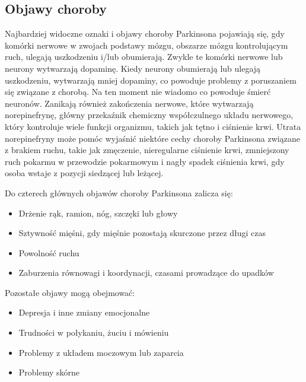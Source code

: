 
\subsection{Objawy choroby}
\label{subsec:objawy}

Najbardziej widoczne oznaki i objawy choroby Parkinsona pojawiają się, gdy komórki nerwowe w zwojach podstawy mózgu,
obszarze mózgu kontrolującym ruch, ulegają uszkodzeniu i/lub obumierają.
Zwykle te komórki nerwowe lub neurony wytwarzają dopaminę.
Kiedy neurony obumierają lub ulegają uszkodzeniu, wytwarzają mniej dopaminy, co powoduje problemy z poruszaniem się
związane z chorobą.
Na ten moment nie wiadomo co powoduje śmierć neuronów.
Zanikają również zakończenia nerwowe, które wytwarzają norepinefrynę, główny przekaźnik chemiczny
współczulnego układu nerwowego, który kontroluje wiele funkcji organizmu, takich jak tętno i ciśnienie krwi.
Utrata norepinefryny może pomóc wyjaśnić niektóre cechy choroby Parkinsona związane z brakiem ruchu, takie jak zmęczenie,
nieregularne ciśnienie krwi, zmniejszony ruch pokarmu w przewodzie pokarmowym i nagły spadek ciśnienia krwi, gdy osoba wstaje z pozycji siedzącej lub leżącej.

\vspace{0.5cm}
Do czterech głównych objawów choroby Parkinsona zalicza się:
\begin{itemize}[itemsep=0.05pt]
	\item Drżenie rąk, ramion, nóg, szczęki lub głowy
	\item Sztywność mięśni, gdy mięśnie pozostają skurczone przez długi czas
	\item Powolność ruchu
	\item Zaburzenia równowagi i koordynacji, czasami prowadzące do upadków
\end{itemize}

\vspace{0.15cm}
Pozostałe objawy mogą obejmować:
\begin{itemize}[itemsep=0.05pt]
	\item Depresja i inne zmiany emocjonalne
	\item Trudności w połykaniu, żuciu i mówieniu
	\item Problemy z układem moczowym lub zaparcia
	\item Problemy skórne
\end{itemize}


